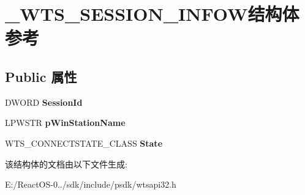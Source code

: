 \hypertarget{struct___w_t_s___s_e_s_s_i_o_n___i_n_f_o_w}{}\section{\+\_\+\+W\+T\+S\+\_\+\+S\+E\+S\+S\+I\+O\+N\+\_\+\+I\+N\+F\+O\+W结构体 参考}
\label{struct___w_t_s___s_e_s_s_i_o_n___i_n_f_o_w}
\subsection*{Public 属性}
\begin{DoxyCompactItemize}
\item 
\mbox{\label{struct___w_t_s___s_e_s_s_i_o_n___i_n_f_o_w_a074525410cff283ff0fa28fde85e662d}} 
D\+W\+O\+RD {\bfseries Session\+Id}
\item 
\mbox{\label{struct___w_t_s___s_e_s_s_i_o_n___i_n_f_o_w_a76f417050e30cc7ab101fe9eabe60f16}} 
L\+P\+W\+S\+TR {\bfseries p\+Win\+Station\+Name}
\item 
\mbox{\label{struct___w_t_s___s_e_s_s_i_o_n___i_n_f_o_w_a572ad554fac1ec73da0f9cf99d907f0d}} 
W\+T\+S\+\_\+\+C\+O\+N\+N\+E\+C\+T\+S\+T\+A\+T\+E\+\_\+\+C\+L\+A\+SS {\bfseries State}
\end{DoxyCompactItemize}


该结构体的文档由以下文件生成\+:\begin{DoxyCompactItemize}
\item 
E\+:/\+React\+O\+S-\/0../sdk/include/psdk/wtsapi32.\+h\end{DoxyCompactItemize}

